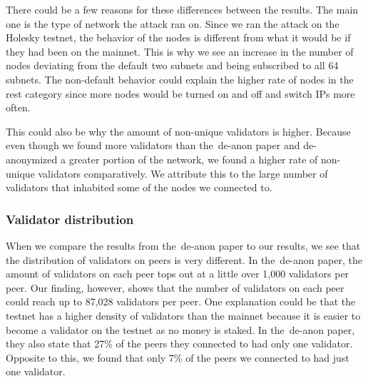 There could be a few reasons for these differences between the results.
The main one is the type of network the attack ran on.
Since we ran the attack on the Holesky testnet, the behavior of the nodes is different from what it would be if they had been on the mainnet.
This is why we see an increase in the number of nodes deviating from the default two subnets and being subscribed to all 64 subnets.
The non-default behavior could explain the higher rate of nodes in the rest category since more nodes would be turned on and off and switch IPs more often.


This could also be why the amount of non-unique validators is higher.
Because even though we found more validators than the~\gls{de-anon paper} and de-anonymized a greater portion of the network, we found a higher rate of non-unique validators comparatively.
We attribute this to the large number of validators that inhabited some of the nodes we connected to.



\subsubsection{Validator distribution}\label{subsubsec:validator-distribution}
When we compare the results from the~\gls{de-anon paper} to our results, we see that the distribution of validators on peers is very different.
In the~\gls{de-anon paper}, the amount of validators on each peer tops out at a little over 1,000 validators per peer.
Our finding, however, shows that the number of validators on each peer could reach up to 87,028 validators per peer.
One explanation could be that the testnet has a higher density of validators than the mainnet because it is easier to become a validator on the testnet as no money is staked.
In the~\gls{de-anon paper}, they also state that 27\% of the peers they connected to had only one validator.
Opposite to this, we found that only 7\% of the peers we connected to had just one validator.
